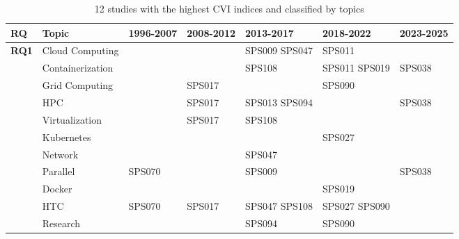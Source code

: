 \begin{table*}[htbp]
	\centering
	\caption{12 studies with the highest CVI indices and classified by topics}
	\label{table:highest_CVI}
	\renewcommand{\arraystretch}{1.2}
	\setlength{\tabcolsep}{6pt}
	\begin{tabularx}{\textwidth}{p{0.8cm}p{2.5cm}>{\raggedright\arraybackslash}X>{\raggedright\arraybackslash}X>{\raggedright\arraybackslash}X>{\raggedright\arraybackslash}X>{\raggedright\arraybackslash}X}
		\toprule
		\textbf{RQ}                          & \textbf{Topic}   & \textbf{1996-2007} & \textbf{2008-2012} & \textbf{2013-2017} & \textbf{2018-2022} & \textbf{2023-2025} \\
		\midrule
		\multirow{12}{*}[0em]{\textbf{RQ1}}  & Cloud Computing  &                    &                    & SPS009 SPS047      & SPS011             &                    \\
		\addlinespace[0.3em]
		                                     & Containerization &                    &                    & SPS108             & SPS011 SPS019      & SPS038             \\
		\addlinespace[0.3em]
		                                     & Grid Computing   &                    & SPS017             &                    & SPS090             &                    \\
		\addlinespace[0.3em]
		                                     & HPC              &                    & SPS017             & SPS013 SPS094      &                    & SPS038             \\
		\addlinespace[0.3em]
		                                     & Virtualization   &                    & SPS017             & SPS108             &                    &                    \\
		\addlinespace[0.3em]
		                                     & Kubernetes       &                    &                    &                    & SPS027             &                    \\
		\addlinespace[0.3em]
		                                     & Network          &                    &                    & SPS047             &                    &                    \\
		\addlinespace[0.3em]
		                                     & Parallel         & SPS070             &                    & SPS009             &                    & SPS038             \\
		\addlinespace[0.3em]
		                                     & Docker           &                    &                    &                    & SPS019             &                    \\
		\addlinespace[0.3em]
		                                     & HTC              & SPS070             & SPS017             & SPS047 SPS108      & SPS027 SPS090      &                    \\
		\midrule
		\multirow{0}{*}[1.2em]{\textbf{RQ2}} & Research         &                    &                    & SPS094             & SPS090             &                    \\
		\bottomrule
	\end{tabularx}
\end{table*}

